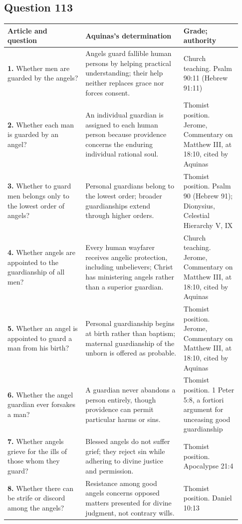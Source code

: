 \subsection{Question 113}
\begin{longtable}{@{}>{\raggedright\arraybackslash}p{0.31\linewidth}>{\raggedright\arraybackslash}p{0.39\linewidth}>{\raggedright\arraybackslash}p{0.23\linewidth}@{}}
\toprule
Article and question & Aquinas's determination & Grade; authority\\
\midrule\endhead
\textbf{1.} Whether men are guarded by the angels? & Angels guard fallible human persons by helping practical understanding; their help neither replaces grace nor forces consent. & Church teaching. Psalm 90:11 (Hebrew 91:11)\\
\textbf{2.} Whether each man is guarded by an angel? & An individual guardian is assigned to each human person because providence concerns the enduring individual rational soul. & Thomist position. Jerome, Commentary on Matthew III, at 18:10, cited by Aquinas\\
\textbf{3.} Whether to guard men belongs only to the lowest order of angels? & Personal guardians belong to the lowest order; broader guardianships extend through higher orders. & Thomist position. Psalm 90 (Hebrew 91); Dionysius, Celestial Hierarchy V, IX\\
\textbf{4.} Whether angels are appointed to the guardianship of all men? & Every human wayfarer receives angelic protection, including unbelievers; Christ has ministering angels rather than a superior guardian. & Church teaching. Jerome, Commentary on Matthew III, at 18:10, cited by Aquinas\\
\textbf{5.} Whether an angel is appointed to guard a man from his birth? & Personal guardianship begins at birth rather than baptism; maternal guardianship of the unborn is offered as probable. & Thomist position. Jerome, Commentary on Matthew III, at 18:10, cited by Aquinas\\
\textbf{6.} Whether the angel guardian ever forsakes a man? & A guardian never abandons a person entirely, though providence can permit particular harms or sins. & Thomist position. 1 Peter 5:8, a fortiori argument for unceasing good guardianship\\
\textbf{7.} Whether angels grieve for the ills of those whom they guard? & Blessed angels do not suffer grief; they reject sin while adhering to divine justice and permission. & Thomist position. Apocalypse 21:4\\
\textbf{8.} Whether there can be strife or discord among the angels? & Resistance among good angels concerns opposed matters presented for divine judgment, not contrary wills. & Thomist position. Daniel 10:13\\
\bottomrule
\end{longtable}
